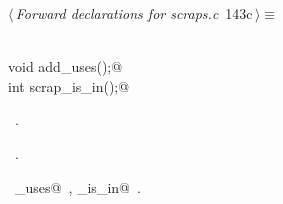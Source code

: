 \documentclass[a4paper]{report}
\begin{document}
\begin{flushleft} \small
\begin{minipage}{\linewidth}\label{scrap311}\raggedright\small
{} $\langle\,${\it Forward declarations for scraps.c}\nobreak\ {\footnotesize {143c}}$\,\rangle\equiv$
\vspace{-1ex}
\begin{list}{}{} \item
\mbox{}\verb@@\\
\mbox{}\verb@static void add_uses();@\\
\mbox{}\verb@static int scrap_is_in();@\\
\mbox{}\verb@@{\NWsep}
\end{list}
\vspace{-1.5ex}
\footnotesize
\begin{list}{}{\setlength{\itemsep}{-\parsep}\setlength{\itemindent}{-\leftmargin}}
\item \NWtxtMacroDefBy\ .
\item \NWtxtMacroRefIn\ .
\item \NWtxtIdentsUsed\nobreak\  \verb@add_uses@\nobreak\ , \verb@scrap_is_in@\nobreak\ .
\item{}
\end{list}
\end{minipage}\vspace{4ex}
\end{flushleft}
\end{document}
